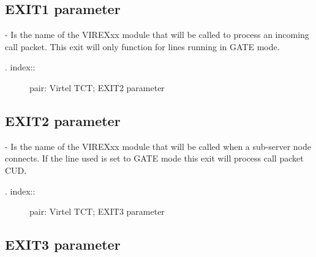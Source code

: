 \documentclass[letterpaper,10pt,english]{sphinxmanual}
\begin{document}
\subsection{EXIT1 parameter}
\label{\detokenize{Installation_Guide:exit1-parameter}}
\begin{sphinxVerbatim}[commandchars=\\\{\}]
 
\end{sphinxVerbatim}

 - Is the name of the VIREXxx module that will be called to process an incoming call packet. This exit will only function for lines running in GATE mode.
\begin{description}
\item[{. index::}] \leavevmode
pair: Virtel TCT; EXIT2 parameter

\end{description}


\subsection{EXIT2 parameter}
\label{\detokenize{Installation_Guide:exit2-parameter}}
\begin{sphinxVerbatim}[commandchars=\\\{\}]
 
\end{sphinxVerbatim}

 - Is the name of the VIREXxx module that will be called when a sub-server node connects. If the line used is set to GATE mode this exit will process call packet CUD.
\begin{description}
\item[{. index::}] \leavevmode
pair: Virtel TCT; EXIT3 parameter

\end{description}


\subsection{EXIT3 parameter}
\label{\detokenize{Installation_Guide:exit3-parameter}}
\begin{sphinxVerbatim}[commandchars=\\\{\}]
 
\end{sphinxVerbatim}
\end{document}
